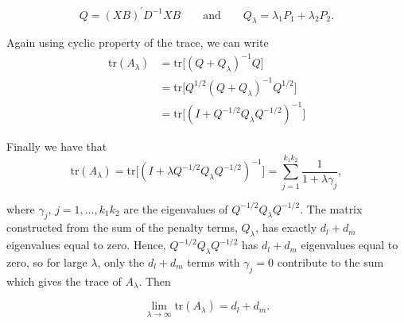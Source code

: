 \begin{equation*}
Q = \left(X B\right)^\prime D^{-1} XB \qquad \mbox{and} \qquad Q_\lambda = \lambda_1 P_1 + \lambda_2 P_2.
\end{equation*}

Again using cyclic property of the trace, we can write
\begin{align*}
\mbox{tr}\left(A_\lambda \right) &= \mbox{tr}\bigg[ \left(Q + Q_\lambda \right)^{-1}Q \bigg]\\
&=\mbox{tr}\bigg[ Q^{1/2}\left(Q + Q_\lambda \right)^{-1}Q^{1/2} \bigg] \\
&=\mbox{tr}\bigg[\left(I + Q^{-{1/2}}Q_\lambda Q^{-{1/2}} \right)^{-1} \bigg]
\end{align*}

\noindent
Finally we have that
\begin{equation*}
\mbox{tr}\left(A_\lambda \right) = \mbox{tr}\bigg[\left(I + \lambda Q^{-{1/2}}Q_\lambda Q^{-{1/2}}  \right)^{-1} \bigg] = \sum_{j=1}^{k_1k_2} \frac{1}{1 + \lambda \gamma_j},
\end{equation*}

\noindent
where $\gamma_j$, $j=1,\dots,k_1k_2$ are the eigenvalues of $Q^{-{1/2}}Q_\lambda Q^{-{1/2}}$. The matrix constructed from the sum of the penalty terms, $Q_\lambda$, has exactly $d_l + d_m$ eigenvalues equal to zero. Hence, $Q^{-{1/2}}Q_\lambda Q^{-{1/2}} $ has $d_l + d_m$ eigenvalues equal to zero, so for large $\lambda$, only the $d_l + d_m$ terms with $\gamma_j=0$ contribute to the sum which gives the trace of $A_\lambda$. Then
 
 \[
\lim_{\lambda \rightarrow \infty  } \mbox{tr}\left(A_\lambda\right) = d_l + d_m.
 \]

%
%

